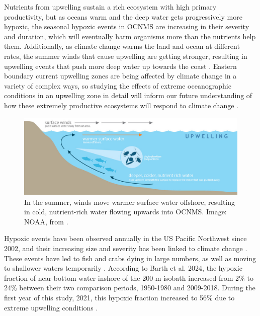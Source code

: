 \documentclass[12pt,twoside]{reedthesis}
\begin{document}
Nutrients from upwelling sustain a rich ecosystem with high primary productivity, but as oceans warm and the deep water gets progressively more hypoxic, the seasonal hypoxic events in OCNMS are increasing in their severity and duration, which will eventually harm organisms more than the nutrients help them. Additionally, as climate change warms the land and ocean at different rates, the summer winds that cause upwelling are getting stronger, resulting in upwelling events that push more deep water up towards the coast \autocite{Barth2024}. Eastern boundary current upwelling zones are being affected by climate change in a variety of complex ways, so studying the effects of extreme oceanographic conditions in an upwelling zone in detail will inform our future understanding of how these extremely productive ecosystems will respond to climate change \autocite{Bograd2023}.

\begin{figure}[!h]
	\begin{center}
		\includegraphics[scale=0.4]{Fig_NOAA_Upwelling}
		\caption[Upwelling]{\footnotesize{In the summer, winds move warmer surface water offshore, resulting in cold, nutrient-rich water flowing upwards into OCNMS. Image: NOAA, from \autocite{OceanographyOlympicCoast}.}} %
		\label{Upwelling}
	\end{center}
\end{figure} 

Hypoxic events have been observed annually in the US Pacific Northwest since 2002, and their increasing size and severity has been linked to climate change \autocite{Bograd2023, Parks2009}. These events have led to fish and crabs dying in large numbers, as well as moving to shallower waters temporarily \autocite{Grantham2004}. According to Barth et al. 2024, the hypoxic fraction of near-bottom water inshore of the 200-m isobath increased from 2\% to 24\% between their two comparison periods, 1950-1980 and 2009-2018. During the first year of this study, 2021, this hypoxic fraction increased to 56\% due to extreme upwelling conditions \autocite{Barth2024}. 
\end{document}
